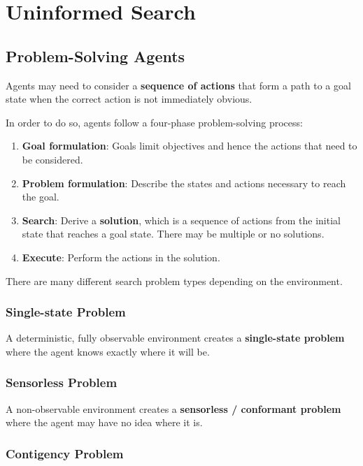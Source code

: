 \section{Uninformed Search}


\subsection{Problem-Solving Agents}

Agents may need to consider a \textbf{sequence of actions} that form a path to a goal state when the correct action is not immediately obvious.

In order to do so, agents follow a four-phase problem-solving process:

\begin{enumerate}[leftmargin=*]
    \item \textbf{Goal formulation}: Goals limit objectives and hence the actions that need to be considered.
    \item \textbf{Problem formulation}: Describe the states and actions necessary to reach the goal.
    \item \textbf{Search}: Derive a \textbf{solution}, which is a sequence of actions from the initial state that reaches a goal state. There may be multiple or no solutions.
    \item \textbf{Execute}: Perform the actions in the solution.
\end{enumerate}

There are many different search problem types depending on the environment.


\subsubsection{Single-state Problem}

A deterministic, fully observable environment creates a \textbf{single-state problem} where the agent knows exactly where it will be.


\subsubsection{Sensorless Problem}

A non-observable environment creates a \textbf{sensorless / conformant problem} where the agent may have no idea where it is.


\subsubsection{Contigency Problem}

